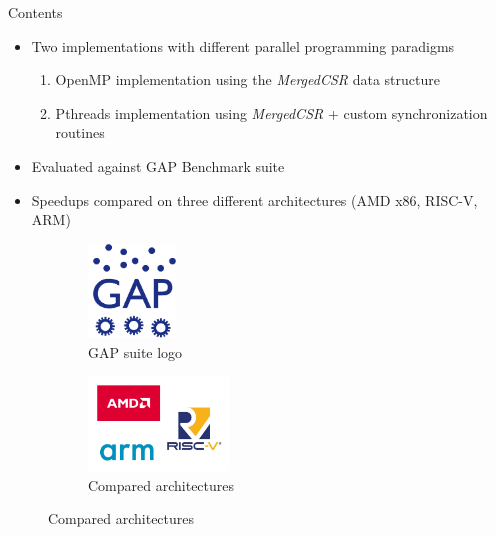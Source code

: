 \begin{frame}{Contents}
\begin{itemize}
    \item Two implementations with different \alert{parallel programming paradigms}
    \begin{enumerate}
        \item OpenMP implementation using the \textit{MergedCSR} data structure
        \item Pthreads implementation using \textit{MergedCSR} + custom synchronization routines
    \end{enumerate}
    \pause
    \item Evaluated against GAP Benchmark suite
    \item Speedups compared on three different architectures (AMD x86, RISC-V, ARM)
\end{itemize}
\begin{figure}
    \centering
    \begin{subfigure}[c]{0.4\textwidth}
    \centering
        \includegraphics[height=2.5cm]{images/gapbs.png}
        \caption{GAP suite logo}
    \end{subfigure}
    \begin{subfigure}[c]{0.4\textwidth}
        \centering
        \includegraphics[height=2.5cm]{images/architectures.png}
        \caption{Compared architectures}
    \end{subfigure}
\end{figure}
\end{frame}